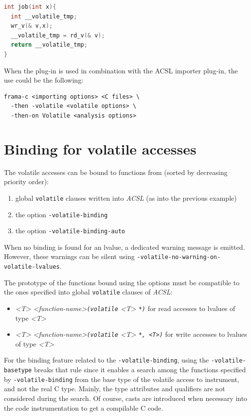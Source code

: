 \documentclass{frama-c-book}
\begin{document}
\begin{lstlisting}[language=c, style=frama-c-style]
int job(int x){
  int __volatile_tmp;
  wr_v(& v,x);
  __volatile_tmp = rd_v(& v);
  return __volatile_tmp;
}

\end{lstlisting}


When the plug-in is used in combination with the ACSL importer plug-in, the use could be the following:

\begin{lstlisting}[language=frama-c-commands, style=frama-c-style]
frama-c <importing options> <C files> \
  -then -volatile <volatile options> \
  -then-on Volatile <analysis options>
\end{lstlisting}

\chapter{Binding for volatile accesses}

The volatile accesses can be bound to functions from (sorted by decreasing priority order):
\begin{enumerate}
\item global \verb|volatile| clauses written into {\sl ACSL} (as into the previous example)
\item the option \verb|-volatile-binding|
\item the option \verb|-volatile-binding-auto|
\end{enumerate}
When no binding is found for an lvalue, a dedicated warning message is emitted.
However, these warnings can be silent using \verb|-volatile-no-warning-on-volatile-lvalues|.

The prototype of the functions bound using the options must be compatible to the ones specified into global \verb|volatile| clauses of {\sl ACSL}:
\begin{itemize}
\item  {\sl <T> <function-name>\verb|(volatile| <T> \verb|*)|} for read accesses to lvalues of type {\sl <T>}
\item  {\sl <T> <function-name>\verb|(volatile| <T> \verb|*, <T>)|} for write accesses to lvalues of type {\sl <T>}
\end{itemize}

For the binding feature related to the \verb|-volatile-binding|, using the
\verb|-volatile-basetype| breaks that rule since it enables a search among the
functions specified by \verb|-volatile-binding| from the base type of the volatile
access to instrument, and not the real C type.
Mainly, the type attributes and qualifiers are not considered during the search.
Of course, casts are introduced when necessary into the code instrumentation to get a compilable C code.
\end{document}

